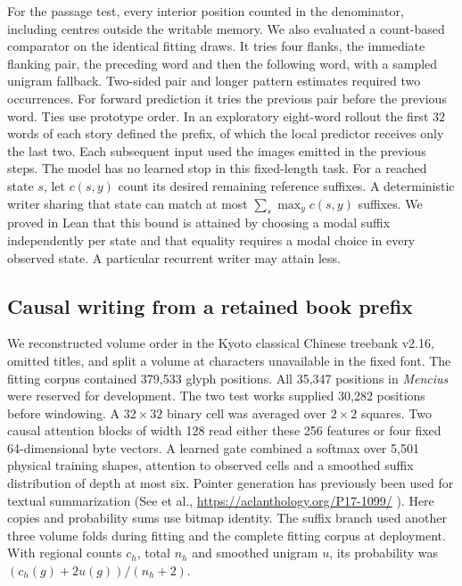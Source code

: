 \documentclass[12pt,a4paper]{article}
\providecommand{\DIFadd}[1]{{\protect\color{blue} \sf #1}} %
\begin{document}
\DIFadd{For the passage test, every interior position counted in the denominator, including centres outside the writable memory. We also evaluated a count-based comparator on the identical fitting draws. It tries four flanks, the immediate flanking pair, the preceding word and then the following word, with a sampled unigram fallback. Two-sided pair and longer pattern estimates required two occurrences. For forward prediction it tries the previous pair before the previous word. Ties use prototype order. In an exploratory eight-word rollout the first 32 words of each story defined the prefix, of which the local predictor receives only the last two. Each subsequent input used the images emitted in the previous steps. The model has no learned stop in this fixed-length task. For a reached state $s$, let $c(s,y)$ count its desired remaining reference suffixes. A deterministic writer sharing that state can match at most $\sum_s\max_y c(s,y)$ suffixes. We proved in Lean that this bound is attained by choosing a modal suffix independently per state and that equality requires a modal choice in every observed state. A particular recurrent writer may attain less.
}

\subsection*{\DIFadd{Causal writing from a retained book prefix}}
\DIFadd{We reconstructed volume order in the Kyoto classical Chinese treebank v2.16, omitted titles, and split a volume at characters unavailable in the fixed font. The fitting corpus contained 379,533 glyph positions. All 35,347 positions in \emph{Mencius} were reserved for development. The two test works supplied 30,282 positions before windowing. A $32\times32$ binary cell was averaged over $2\times2$ squares. Two causal attention blocks of width 128 read either these 256 features or four fixed 64-dimensional byte vectors. A learned gate combined a softmax over 5,501 physical training shapes, attention to observed cells and a smoothed suffix distribution of depth at most six. Pointer generation has previously been used for textual summarization (See et al., }\url{https://aclanthology.org/P17-1099/}\DIFadd{). Here copies and probability sums use bitmap identity. The suffix branch used another three volume folds during fitting and the complete fitting corpus at deployment. With regional counts $c_h$, total $n_h$ and smoothed unigram $u$, its probability was $(c_h(g)+2u(g))/(n_h+2)$.
}
\end{document}
